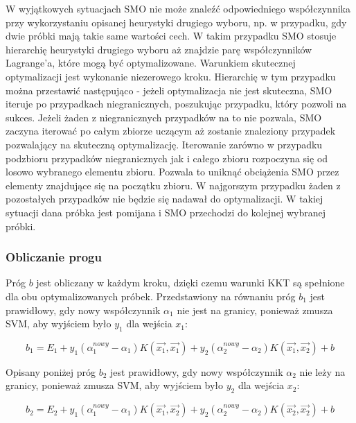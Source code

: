 \documentclass[[10pt,a4paper]{article}
\begin{document}
W wyjątkowych sytuacjach SMO nie może znaleźć odpowiedniego współczynnika przy wykorzystaniu opisanej heurystyki drugiego wyboru, np. w przypadku, gdy dwie próbki mają takie same wartości cech. W takim przypadku SMO stosuje hierarchię heurystyki drugiego wyboru aż znajdzie parę współczynników Lagrange'a, które mogą być optymalizowane. Warunkiem skutecznej optymalizacji jest wykonanie niezerowego kroku. Hierarchię w tym przypadku można przestawić następująco - jeżeli optymalizacja nie jest skuteczna, SMO iteruje po przypadkach niegranicznych, poszukując przypadku, który pozwoli na sukces. Jeżeli żaden z niegranicznych przypadków na to nie pozwala, SMO zaczyna iterować po całym zbiorze uczącym aż zostanie znaleziony przypadek pozwalający na skuteczną optymalizację. Iterowanie zarówno w przypadku podzbioru przypadków niegranicznych jak i całego zbioru rozpoczyna się od losowo wybranego elementu zbioru. Pozwala to uniknąć obciążenia SMO przez elementy znajdujące się na początku zbioru. W najgorszym przypadku żaden z pozostałych przypadków nie będzie się nadawał do optymalizacji. W takiej sytuacji dana próbka jest pomijana i SMO przechodzi do kolejnej wybranej próbki.


\subsubsection{Obliczanie progu}


Próg $b$ jest obliczany w każdym kroku, dzięki czemu warunki KKT są spełnione dla obu optymalizowanych próbek. Przedstawiony na równaniu próg $b_1$ jest prawidłowy, gdy nowy współczynnik $\alpha_1$ nie jest na granicy, ponieważ zmusza SVM, aby wyjściem było $y_1$ dla wejścia $x_1$:

\begin{equation}
b_1 = E_1 + y_1(\alpha^{nowy}_1 - \alpha_1)K(\overrightarrow{x_1},\overrightarrow{x_1}) + y_2(\alpha^{nowy}_2 - \alpha_2)K(\overrightarrow{x_1},\overrightarrow{x_2}) + b
\end{equation}


Opisany poniżej próg $b_2$ jest prawidłowy, gdy nowy współczynnik $\alpha_2$ nie leży na granicy, ponieważ zmusza SVM, aby wyjściem było $y_2$ dla wejścia $x_2$:

\begin{equation}
b_2 = E_2 + y_1(\alpha^{nowy}_1 - \alpha_1)K(\overrightarrow{x_1},\overrightarrow{x_2}) + y_2(\alpha^{nowy}_2 - \alpha_2)K(\overrightarrow{x_2},\overrightarrow{x_2}) + b
\end{equation}
\end{document}
